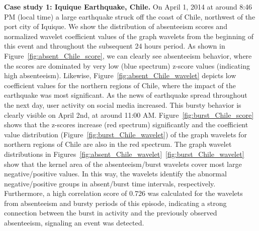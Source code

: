 \textbf{Case study 1: Iquique Earthquake, Chile.}
On April 1, 2014 at around 8:46 PM (local time) a large earthquake struck off the coast of Chile, northwest of the port city of Iquique. We show the distribution of absenteeism scores and normalized wavelet coefficient values of the graph wavelets from the beginning of this event and throughout the subsequent 24 hours period. As shown in Figure~\ref{fig:absent_Chile_score}, we can clearly see absenteeism behavior, where the scores are dominated by very low (blue spectrum) z-score values (indicating high absenteeism). Likewise, Figure~\ref{fig:absent_Chile_wavelet} depicts low coefficient values for the northern regions of Chile, where the impact of the earthquake was most significant. As the news of earthquake spread throughout the next day, user activity on social media increased. This bursty behavior is clearly visible on April 2nd, at around 11:00 AM. Figure~\ref{fig:burst_Chile_score} shows that the z-scores increase (red spectrum) significantly and the coefficient value distribution (Figure~\ref{fig:burst_Chile_wavelet}) of the graph wavelets for northern regions of Chile are also in the red spectrum. The graph wavelet distributions in Figures~\ref{fig:absent_Chile_wavelet}~\ref{fig:burst_Chile_wavelet} show that the kernel area of the absenteeism/burst wavelets cover most large negative/positive values. In this way, the wavelets identify the abnormal negative/positive groups in absent/burst time intervals, respectively. Furthermore, a high correlation score of 0.726 was calculated for the wavelets from absenteeism and bursty periods of this episode, indicating a strong connection between the burst in activity and the previously observed absenteeism, signaling an event was detected.



